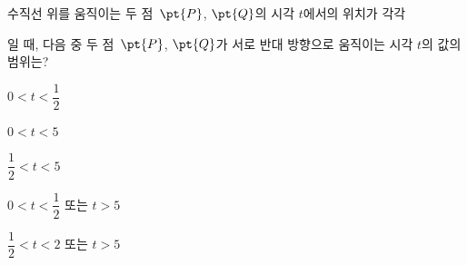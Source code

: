 수직선 위를 움직이는 두 점~$\pt{P}$, $\pt{Q}$의 시각 $t$에서의 위치가 각각\par\smallskip{}\par\smallskip\noindent 일 때, 다음 중 두 점~$\pt{P}$, $\pt{Q}$가 서로 반대 방향으로 움직이는 시각 $t$의 값의 범위는?
\begin{choicesii}{\rule[-3ex]{0pt}{8ex}$0<t<\dfrac{1}{2}$}{\rule[-3ex]{0pt}{8ex}$0<t<5$}{\rule[-3ex]{0pt}{8ex}$\dfrac{1}{2}<t<5$}{\rule[-3ex]{0pt}{8ex}$0<t<\dfrac{1}{2}$ 또는 $t>5$}{\rule[-3ex]{0pt}{8ex}$\dfrac{1}{2}<t<2$ 또는 $t>5$}\end{choicesii}
